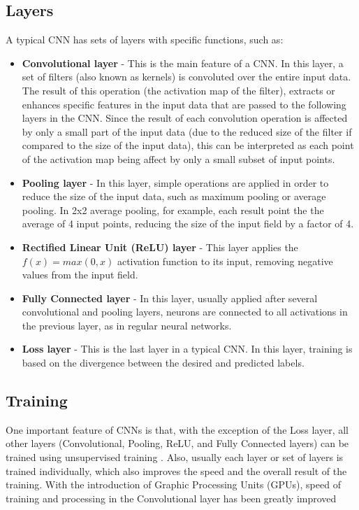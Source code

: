\subsection{Layers}
\label{sec:convolution:convolutionalneuralnetworks:layers}
A typical CNN has sets of layers with specific functions, such as:
\begin{itemize}
    \item \textbf{Convolutional layer} - This is the main feature of a CNN.\newline
    In this layer, a set of filters (also known as kernels) is convoluted over the entire input data. The result of this operation (the activation map of the filter), extracts or enhances specific features in the input data that are passed to the following layers in the CNN.\newline
    Since the result of each convolution operation is affected by only a small part of the input data (due to the reduced size of the filter if compared to the size of the input data), this can be interpreted as each point of the activation map being affect by only a small subset of input points.
    \item \textbf{Pooling layer} - In this layer, simple operations are applied in order to reduce the size of the input data, such as maximum pooling or average pooling.\newline
    In 2x2 average pooling, for example, each result point the the average of 4 input points, reducing the size of the input field by a factor of 4.
    \item \textbf{Rectified Linear Unit (ReLU) layer} - This layer applies the $f(x) = max(0,x)$ activation function to its input, removing negative values from the input field.
    \item \textbf{Fully Connected layer} - In this layer, usually applied after several convolutional and pooling layers, neurons are connected to all activations in the previous layer, as in regular neural networks.
    \item \textbf{Loss layer} - This is the last layer in a typical CNN. In this layer, training is based on the divergence between the desired and predicted labels.
\end{itemize}
\subsection{Training}
\label{sec:convolution:convolutionalneuralnetworks:training}
One important feature of CNNs is that, with the exception of the Loss layer, all other layers (Convolutional, Pooling, ReLU, and Fully Connected layers) can be trained using unsupervised training  \citep{Arel2010}.\newline
Also, usually each layer or set of layers is trained individually, which also improves the speed and the overall result of the training.\newline
With the introduction of Graphic Processing Units (GPUs), speed of training and processing in the Convolutional layer has been greatly improved  \citep{Steinkrau2005}
